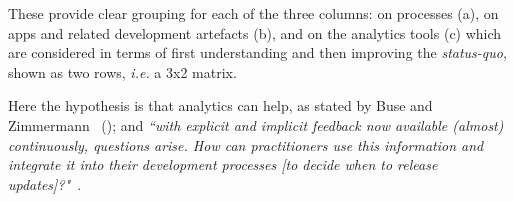 These provide clear grouping for each of the three columns: on processes (a), on apps and related development artefacts (b), and on the analytics tools (c) which are considered in terms of first understanding and then improving the \emph{status-quo}, shown as two rows, \emph{i.e.} a 3x2 matrix. 


Here the hypothesis is that analytics can help, as stated by Buse and Zimmermann ~(\citeyear{buse_analytics_2010}); and \emph{``with explicit and implicit feedback now available (almost) continuously, questions arise. How can practitioners use this information and integrate it into their development processes [to decide when to release updates]?"}~.

